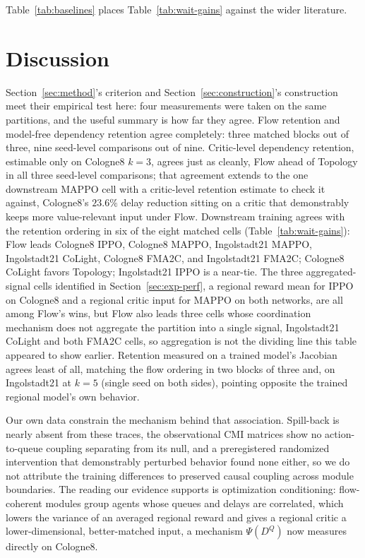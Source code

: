 \documentclass[journal]{IEEEtran}
\theoremstyle{definition}
\begin{document}
Table~\ref{tab:baselines} places Table~\ref{tab:wait-gains} against the wider literature.

\section{Discussion}
\label{sec:discussion}

Section~\ref{sec:method}'s criterion and Section~\ref{sec:construction}'s construction meet their empirical test here: four measurements were taken on the same partitions, and the useful summary is how far they agree. Flow retention and model-free dependency retention agree completely: three matched blocks out of three, nine seed-level comparisons out of nine. Critic-level dependency retention, estimable only on Cologne8 $k=3$, agrees just as cleanly, Flow ahead of Topology in all three seed-level comparisons; that agreement extends to the one downstream MAPPO cell with a critic-level retention estimate to check it against, Cologne8's $23.6\%$ delay reduction sitting on a critic that demonstrably keeps more value-relevant input under Flow.
Downstream training agrees with the retention ordering in six of the eight matched cells (Table~\ref{tab:wait-gains}): Flow leads Cologne8 IPPO, Cologne8 MAPPO, Ingolstadt21 MAPPO, Ingolstadt21 CoLight, Cologne8 FMA2C, and Ingolstadt21 FMA2C; Cologne8 CoLight favors Topology; Ingolstadt21 IPPO is a near-tie.
The three aggregated-signal cells identified in Section~\ref{sec:exp-perf}, a regional reward mean for IPPO on Cologne8 and a regional critic input for MAPPO on both networks, are all among Flow's wins, but Flow also leads three cells whose coordination mechanism does not aggregate the partition into a single signal, Ingolstadt21 CoLight and both FMA2C cells, so aggregation is not the dividing line this table appeared to show earlier. Retention measured on a trained model's Jacobian agrees least of all, matching the flow ordering in two blocks of three and, on Ingolstadt21 at $k=5$ (single seed on both sides), pointing opposite the trained regional model's own behavior.

Our own data constrain the mechanism behind that association.
Spill-back is nearly absent from these traces, the observational CMI matrices show no action-to-queue coupling separating from its null, and a preregistered randomized intervention that demonstrably perturbed behavior found none either, so we do not attribute the training differences to preserved causal coupling across module boundaries.
The reading our evidence supports is optimization conditioning: flow-coherent modules group agents whose queues and delays are correlated, which lowers the variance of an averaged regional reward and gives a regional critic a lower-dimensional, better-matched input, a mechanism $\Psi(D^Q)$ now measures directly on Cologne8.
\end{document}

